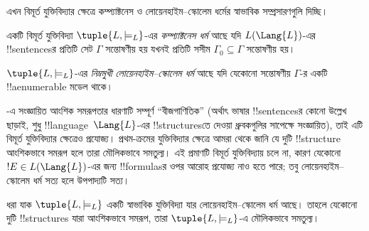 \documentclass[../../../include/open-logic-section]{subfiles}
\begin{document}


এখন বিমূর্ত যুক্তিবিদ্যার ক্ষেত্রে কম্প্যাক্টনেস ও
লোয়েনহাইম--স্কোলেম ধর্মের স্বাভাবিক সম্প্রসারণগুলি দিচ্ছি।

\begin{defn}
একটি বিমূর্ত যুক্তিবিদ্যা $\tuple{L, \models_L}$-এর
\emph{কম্প্যাক্টনেস ধর্ম} আছে যদি $L(\Lang{L})$-এর !!{sentence}sর
প্রতিটি সেট $\Gamma$ সন্তোষণীয় হয় যখনই প্রতিটি সসীম
 $\Gamma_0 \subseteq \Gamma$ সন্তোষণীয় হয়।
\end{defn}

\begin{defn}
$\tuple{L, \models_L}$-এর \emph{নিম্নমুখী লোয়েনহাইম--স্কোলেম
ধর্ম} আছে যদি যেকোনো সন্তোষণীয় $\Gamma$-র একটি !!a{enumerable}
মডেল থাকে।
\end{defn}

-এ সংজ্ঞায়িত আংশিক সমরূপতার ধারণাটি
সম্পূর্ণ “বীজগাণিতিক” (অর্থাৎ ভাষার !!{sentence}sর কোনো উল্লেখ ছাড়াই,
শুধু !!{language}~$\Lang{L}$-এর !!{structure}sতে দেওয়া ধ্রুবকগুলির
সাপেক্ষে সংজ্ঞায়িত), তাই এটি বিমূর্ত যুক্তিবিদ্যার ক্ষেত্রেও প্রযোজ্য।
প্রথম-ক্রমের যুক্তিবিদ্যার ক্ষেত্রে আমরা
 থেকে জানি যে দুটি !!{structure} আংশিকভাবে
সমরূপ হলে তারা মৌলিকভাবে সমতুল্য। এই প্রমাণটি বিমূর্ত যুক্তিবিদ্যায়
চলে না, কারণ যেকোনো $!E \in L(\Lang{L})$-এর জন্য !!{formula}sর ওপর
আরোহ প্রযোজ্য নাও হতে পারে; তবু লোয়েনহাইম--স্কোলেম ধর্ম সত্য হলে
উপপাদ্যটি সত্য।

\begin{thm}
ধরা যাক $\tuple{L, \models_L}$ একটি স্বাভাবিক যুক্তিবিদ্যা যার
লোয়েনহাইম--স্কোলেম ধর্ম আছে। তাহলে যেকোনো দুটি !!{structure}s যারা
আংশিকভাবে সমরূপ, তারা $\tuple{L,\models_L}$-এ মৌলিকভাবে সমতুল্য।
\end{thm}
\end{document}
